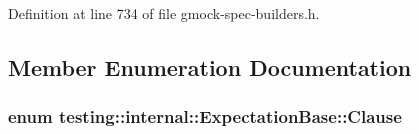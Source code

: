 Definition at line 734 of file gmock-\/spec-\/builders.\+h.



\subsection{Member Enumeration Documentation}
\subsubsection[{\texorpdfstring{Clause}{Clause}}]{\setlength{\rightskip}{0pt plus 5cm}enum {\bf testing\+::internal\+::\+Expectation\+Base\+::\+Clause}\hspace{0.3cm}{\ttfamily [protected]}}\hypertarget{classtesting_1_1internal_1_1_expectation_base_a450f34b979ec5814c91d4eab6b78cfc2}{}\label{classtesting_1_1internal_1_1_expectation_base_a450f34b979ec5814c91d4eab6b78cfc2}
